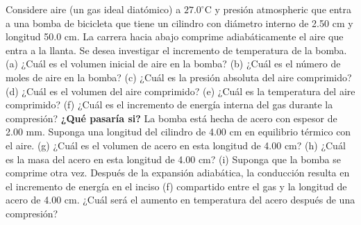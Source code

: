 \item Considere aire (un gas ideal diatómico) a $27.0^\circ\text{C}$ y presión atmospheric que entra a una bomba de bicicleta que tiene un cilindro con diámetro interno de 2.50 cm y longitud 50.0 cm. La carrera hacia abajo comprime adiabáticamente el aire que entra a la llanta. Se desea investigar el incremento de temperatura de la bomba. 
(a) ¿Cuál es el volumen inicial de aire en la bomba? 
(b) ¿Cuál es el número de moles de aire en la bomba? 
(c) ¿Cuál es la presión absoluta del aire comprimido? 
(d) ¿Cuál es el volumen del aire comprimido? 
(e) ¿Cuál es la temperatura del aire comprimido? 
(f) ¿Cuál es el incremento de energía interna del gas durante la compresión? 
\textbf{¿Qué pasaría si?} La bomba está hecha de acero con espesor de 2.00 mm. Suponga una longitud del cilindro de 4.00 cm en equilibrio térmico con el aire. 
(g) ¿Cuál es el volumen de acero en esta longitud de 4.00 cm? 
(h) ¿Cuál es la masa del acero en esta longitud de 4.00 cm? 
(i) Suponga que la bomba se comprime otra vez. Después de la expansión adiabática, la conducción resulta en el incremento de energía en el inciso (f) compartido entre el gas y la longitud de acero de 4.00 cm. ¿Cuál será el aumento en temperatura del acero después de una compresión?
